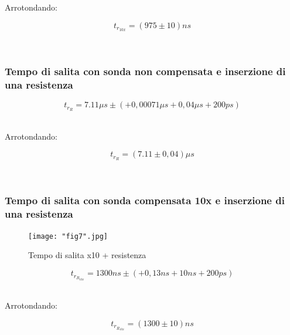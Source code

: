 \documentclass[a4paper]{article}
\begin{document}
Arrotondando: 

\begin{Large}
	\begin{equation}
		{t_{r_{10x}}}= (975\pm 10) ns
	\end{equation}
\end{Large}\\

\subsubsection{Tempo di salita con sonda non compensata e inserzione di una resistenza}

\begin{Large}
	\begin{equation}
		t_{r_R}= 7.11\mu s \pm( + 0,00071\mu s + 0,04\mu s + 200ps)
	\end{equation}
\end{Large}\\

Arrotondando: 

\begin{Large}
	\begin{equation}
		t_{r_R}=( 7.11\pm 0,04) \mu s
	\end{equation}
\end{Large}\\

\subsubsection{Tempo di salita con sonda compensata 10x e inserzione di una resistenza}
\begin{figure}[htp]
	\centering
	\texttt{[image: "fig7".jpg]}
	\caption{Tempo di salita x10 + resistenza }
	\label{}
\end{figure}
\begin{Large}
	\begin{equation}
		{t_{r_{R_{10x}}}}= 1300ns \pm ( + 0,13ns + 10ns + 200ps)
	\end{equation}
\end{Large}\\

Arrotondando: 

\begin{Large}
	\begin{equation}
		{t_{r_{R_{10x}}}}= (1300\pm 10) ns
	\end{equation}
\end{Large}\\
\end{document}
